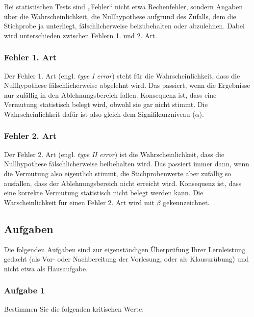 \documentclass[
  ngerman,
]{article}
\begin{document}
Bei statistischen Tests sind „Fehler`` nicht etwa Rechenfehler, sondern Angaben über die Wahrscheinlichkeit, die Nullhypothese aufgrund des Zufalls, dem die Stichprobe ja unterliegt, fälschlicherweise beizubehalten oder abzulehnen. Dabei wird unterschieden zwischen Fehlern 1. und 2. Art.

\hypertarget{fehler-1.-art}{%
\subsubsection{Fehler 1. Art}\label{fehler-1.-art}}

Der Fehler 1. Art (engl. \emph{type I error}) steht für die Wahrscheinlichkeit, dass die Nullhypothese fälschlicherweise abgelehnt wird. Das passiert, wenn die Ergebnisse nur zufällig in den Ablehnungsbereich fallen. Konsequenz ist, dass eine Vermutung statistisch belegt wird, obwohl sie gar nicht stimmt. Die Wahrscheinlichkeit dafür ist also gleich dem Signifikanzniveau (\(\alpha\)).

\hypertarget{fehler-2.-art}{%
\subsubsection{Fehler 2. Art}\label{fehler-2.-art}}

Der Fehler 2. Art (engl. \emph{type II error}) ist die Wahrscheinlichkeit, dass die Nullhypothese fälschlicherweise beibehalten wird. Das passiert immer dann, wenn die Vermutung also eigentlich stimmt, die Stichprobenwerte aber zufällig so ausfallen, dass der Ablehnungsbereich nicht erreicht wird. Konsequenz ist, dass eine korrekte Vermutung statistisch nicht belegt werden kann. Die Warscheinlichkeit für einen Fehler 2. Art wird mit \(\beta\) gekennzeichnet.

\hypertarget{aufgaben-5}{%
\subsection{Aufgaben}\label{aufgaben-5}}

Die folgenden Aufgaben sind zur eigenständigen Überprüfung Ihrer Lernleistung gedacht (als Vor- oder Nachbereitung der Vorlesung, oder als Klausurübung) und nicht etwa als Hausaufgabe.

\hypertarget{aufgabe-1-5}{%
\subsubsection{Aufgabe 1}\label{aufgabe-1-5}}

Bestimmen Sie die folgenden kritischen Werte:
\end{document}
